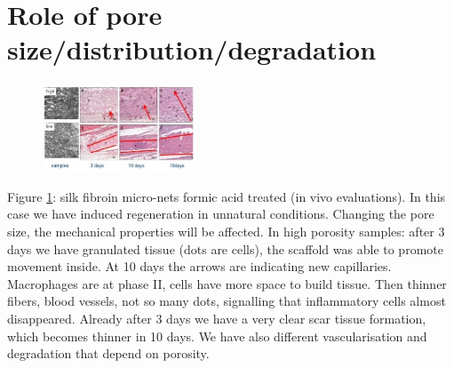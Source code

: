 \section{Role of pore size/distribution/degradation}
\begin{figure}[ht]
\centering
\includegraphics[width=0.4\textwidth]{silk}
\caption{\label{fig:silk}}
\end{figure}

\noindent
Figure \ref{fig:silk}: silk fibroin micro-nets formic acid treated (in vivo evaluations). 
In this case we have induced regeneration in unnatural conditions. 
Changing the pore size, the mechanical properties will be affected. In high porosity samples: after 3 days we have granulated tissue (dots are cells), the scaffold was able to promote movement inside. 
At 10 days the arrows are indicating new capillaries. 
Macrophages are at phase II, cells have more space to build tissue. 
Then thinner fibers, blood vessels, not so many dots, signalling that inflammatory cells almost disappeared. 
Already after 3 days we have a very clear scar tissue formation, which becomes thinner in 10 days. 
\noindent
We have also different vascularisation and degradation that depend on porosity.

